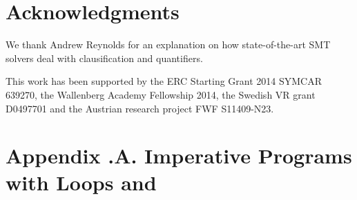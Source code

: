 \section*{Acknowledgments}
\label{sec:newcnf/acknowledgments}
We thank Andrew Reynolds for an explanation on how state-of-the-art SMT solvers deal with clausification and quantifiers. 

This work has been supported by the ERC Starting Grant 2014 SYMCAR 639270, the Wallenberg Academy Fellowship 2014, the Swedish VR grant D0497701 and the Austrian research project FWF S11409-N23.


\newpage
\section*{Appendix \thechapter.A. Imperative Programs with Loops and \ITE}
\label{sec:newcnf/examples}

